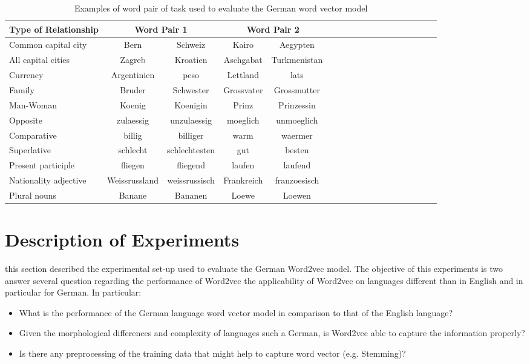 \begin{table}[h]
  \centering
  \caption{Examples of word pair  of task  used  to evaluate the German word
    vector model }
  \label{tab:task_deutsch_modified}

  \begin{tabular}{ |l| |c|*{4}{c| |c| c | c }  }

  \hline           
  Type of Relationship &  \multicolumn{2}{c||}{Word Pair 1} &
  \multicolumn{2}{c|}{Word Pair 2} \\  \hline           
  Common capital city & Bern &  Schweiz & Kairo  & Aegypten \\ 
  All capital cities  & Zagreb &  Kroatien & Aschgabat & Turkmenistan  \\
  Currency & Argentinien & peso  & Lettland  & lats \\ 
  Family & Bruder & Schwester  & Grossvater & Grossmutter \\
  Man-Woman & Koenig & Koenigin  &  Prinz & Prinzessin   \\  \hline  
  Opposite & zulaessig & unzulaessig & moeglich & unmoeglich \\  
  Comparative & billig & billiger & warm & waermer \\  
  Superlative & schlecht & schlechtesten & gut & besten \\  
  Present participle & fliegen & fliegend & laufen & laufend \\  
  Nationality adjective & Weissrussland & weissrussisch & Frankreich  & franzoesisch  \\  
  Plural nouns  & Banane & Bananen & Loewe & Loewen \\
  \hline
\end{tabular}
\end{table}



\section{Description of Experiments}
\label{sec:german_eng_experiments}

this section described the experimental set-up used to evaluate the German
Word2vec model. The objective of this experiments is two answer several
question regarding the performance of Word2vec the applicability of Word2vec
on languages different than in English and in particular for German.  In
particular:

\begin{itemize}
\item What is the performance of the German language word vector model in comparison to that of
  the English language?
\item Given the morphological differences and complexity of languages such
  a German, is Word2vec able to capture the information properly?
\item Is there any preprocessing of the training data  that might help to capture word vector
  (e.g. Stemming)?
\end{itemize}

